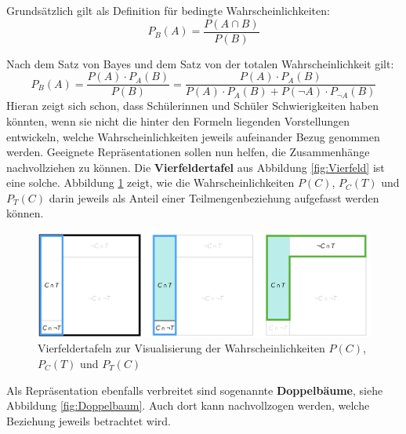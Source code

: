 \documentclass[
]{scrbook}
\theoremstyle{definition}
\theoremstyle{definition}
\theoremstyle{definition}
\theoremstyle{definition}
\theoremstyle{remark}
\begin{document}
Grundsätzlich gilt als Definition für bedingte Wahrscheinlichkeiten: \[P_B(A) = \frac{P(A\cap B)}{P(B)}\]

Nach dem Satz von Bayes und dem Satz von der totalen Wahrscheinlichkeit gilt:
\[P_B(A) = \frac{P(A)\cdot P_A(B)}{P(B)} = \frac{P(A)\cdot P_A(B)}{P(A)\cdot P_A(B)+P(\neg A)\cdot P_{\neg A}(B)}\]
Hieran zeigt sich schon, dass Schülerinnen und Schüler Schwierigkeiten haben könnten, wenn sie nicht die hinter den Formeln liegenden Vorstellungen entwickeln, welche Wahrscheinlichkeiten jeweils aufeinander Bezug genommen werden. Geeignete Repräsentationen sollen nun helfen, die Zusammenhänge nachvollziehen zu können. Die \textbf{Vierfeldertafel} aus Abbildung \ref{fig:Vierfeld} ist eine solche. Abbildung \ref{fig:VierfeldEinzeln} zeigt, wie die Wahrscheinlichkeiten \(P(C)\), \(P_C(T)\) und \(P_T(C)\) darin jeweils als Anteil einer Teilmengenbeziehung aufgefasst werden können.

\begin{figure}

{\centering \includegraphics[width=0.95\linewidth]{pictures/14-VierfeldEinzeln} 

}

\caption{Vierfeldertafeln zur Visualisierung der Wahrscheinlichkeiten $P(C)$, $P_C(T)$ und $P_T(C)$}\label{fig:VierfeldEinzeln}
\end{figure}

Als Repräsentation ebenfalls verbreitet sind sogenannte \textbf{Doppelbäume}, siehe Abbildung \ref{fig:Doppelbaum}. Auch dort kann nachvollzogen werden, welche Beziehung jeweils betrachtet wird.
\end{document}
